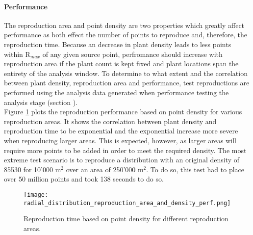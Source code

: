 \paragraph{Performance}

The reproduction area and point density are two properties which greatly affect performance as both effect the number of points to reproduce and, therefore, the reproduction time. Because an decrease in plant density leads to less points within R$_{max}$ of any given source point, perfromance should increase with reproduction area if the plant count is kept fixed and plant locations span the entirety of the analysis window. To determine to what extent and the correlation between plant density, reproduction area and performance, test reproductions are performed using the analysis data generated when performance testing the analysis stage (section \label{subsec:radial_dist_analysis}).\\

Figure \ref{fig:reproduction_density_area_perf} plots the reproduction performance based on point density for various reproduction areas. It shows the correlation between plant density and reproduction time to be exponential and the exponential increase more severe when reproducing larger areas. This is expected, however, as larger areas will require more points to be added in order to meet the required density. The most extreme test scenario is to reproduce a distribution with an original density of 85530 for 10'000 m$^{2}$ over an area of 250'000 m$^{2}$. To do so, this test had to place over 50 million points and took 138 seconds to do so.\\

\begin{figure}
\center
	\texttt{[image: radial\_distribution\_reproduction\_area\_and\_density\_perf.png]}
	\caption{ Reproduction time based on point density for different reproduction areas.}	
	\label{fig:reproduction_density_area_perf}
\end{figure}

